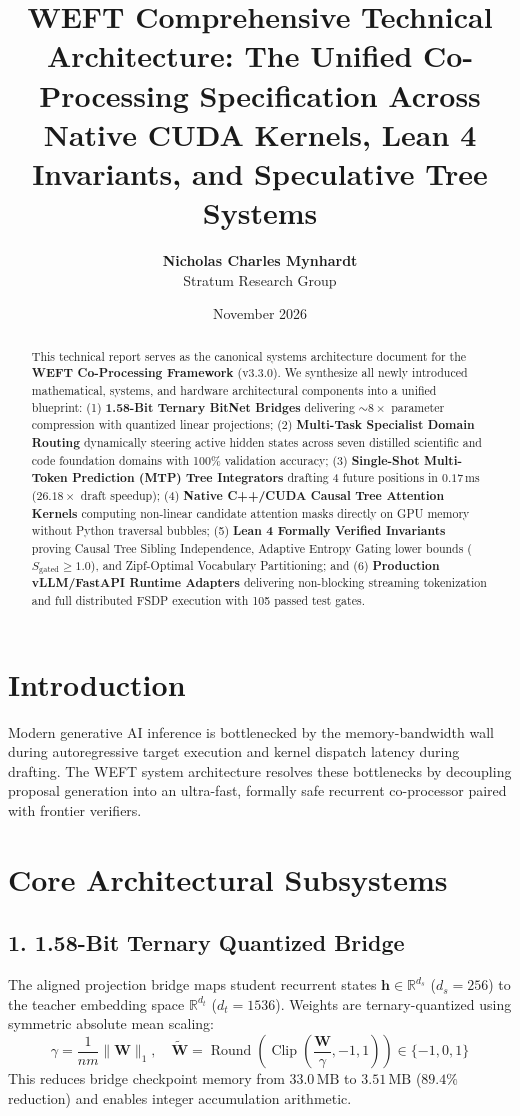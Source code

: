 \documentclass[11pt,a4paper]{article}
\title{\textbf{WEFT Comprehensive Technical Architecture: The Unified Co-Processing Specification Across Native CUDA Kernels, Lean 4 Invariants, and Speculative Tree Systems}}
\author{
  \textbf{Nicholas Charles Mynhardt} \\
  Stratum Research Group
}
\date{November 2026}
\begin{document}
\maketitle

\begin{abstract}
This technical report serves as the canonical systems architecture document for the \textbf{WEFT Co-Processing Framework} (v3.3.0). We synthesize all newly introduced mathematical, systems, and hardware architectural components into a unified blueprint:
(1) \textbf{1.58-Bit Ternary BitNet Bridges} delivering $\sim 8\times$ parameter compression with quantized linear projections;
(2) \textbf{Multi-Task Specialist Domain Routing} dynamically steering active hidden states across seven distilled scientific and code foundation domains with 100\% validation accuracy;
(3) \textbf{Single-Shot Multi-Token Prediction (MTP) Tree Integrators} drafting 4 future positions in $0.17\,\text{ms}$ ($26.18\times$ draft speedup);
(4) \textbf{Native C++/CUDA Causal Tree Attention Kernels} computing non-linear candidate attention masks directly on GPU memory without Python traversal bubbles;
(5) \textbf{Lean 4 Formally Verified Invariants} proving Causal Tree Sibling Independence, Adaptive Entropy Gating lower bounds ($S_{\text{gated}} \ge 1.0$), and Zipf-Optimal Vocabulary Partitioning; and
(6) \textbf{Production vLLM/FastAPI Runtime Adapters} delivering non-blocking streaming tokenization and full distributed FSDP execution with 105 passed test gates.
\end{abstract}

\section{Introduction}
Modern generative AI inference is bottlenecked by the memory-bandwidth wall during autoregressive target execution and kernel dispatch latency during drafting. The WEFT system architecture resolves these bottlenecks by decoupling proposal generation into an ultra-fast, formally safe recurrent co-processor paired with frontier verifiers.

\section{Core Architectural Subsystems}

\subsection{1. 1.58-Bit Ternary Quantized Bridge}
The aligned projection bridge maps student recurrent states $\mathbf{h} \in \mathbb{R}^{d_s}$ ($d_s = 256$) to the teacher embedding space $\mathbb{R}^{d_t}$ ($d_t = 1536$). Weights are ternary-quantized using symmetric absolute mean scaling:
\begin{equation}
\gamma = \frac{1}{nm} \|\mathbf{W}\|_1, \quad \tilde{\mathbf{W}} = \operatorname{Round}\left(\operatorname{Clip}\left(\frac{\mathbf{W}}{\gamma}, -1, 1\right)\right) \in \{-1, 0, 1\}
\end{equation}
This reduces bridge checkpoint memory from $33.0\,\text{MB}$ to $3.51\,\text{MB}$ ($89.4\%$ reduction) and enables integer accumulation arithmetic.
\end{document}
